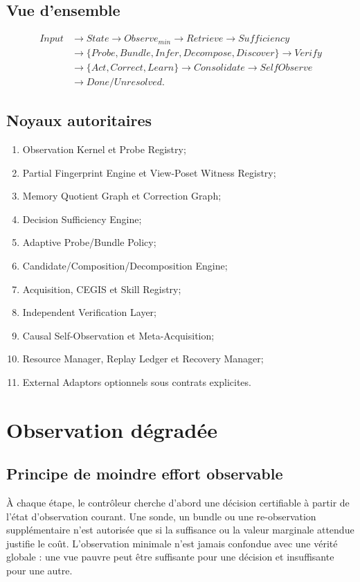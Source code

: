 \documentclass[11pt,a4paper]{report}
\begin{document}
\section{Vue d'ensemble}
\[
\begin{aligned}
Input &\to State \to Observe_{min} \to Retrieve \to Sufficiency \\
&\to \{Probe,Bundle,Infer,Decompose,Discover\} \to Verify \\
&\to \{Act,Correct,Learn\} \to Consolidate \to SelfObserve \\
&\to Done/Unresolved.
\end{aligned}
\]
\section{Noyaux autoritaires}
\begin{enumerate}
\item Observation Kernel et Probe Registry;
\item Partial Fingerprint Engine et View-Poset Witness Registry;
\item Memory Quotient Graph et Correction Graph;
\item Decision Sufficiency Engine;
\item Adaptive Probe/Bundle Policy;
\item Candidate/Composition/Decomposition Engine;
\item Acquisition, CEGIS et Skill Registry;
\item Independent Verification Layer;
\item Causal Self-Observation et Meta-Acquisition;
\item Resource Manager, Replay Ledger et Recovery Manager;
\item External Adaptors optionnels sous contrats explicites.
\end{enumerate}

\chapter{Observation dégradée}
\section{Principe de moindre effort observable}
À chaque étape, le contrôleur cherche d'abord une décision certifiable à partir de l'état d'observation courant. Une sonde, un bundle ou une re-observation supplémentaire n'est autorisée que si la suffisance ou la valeur marginale attendue justifie le coût. L'observation minimale n'est jamais confondue avec une vérité globale : une vue pauvre peut être suffisante pour une décision et insuffisante pour une autre.
\end{document}

